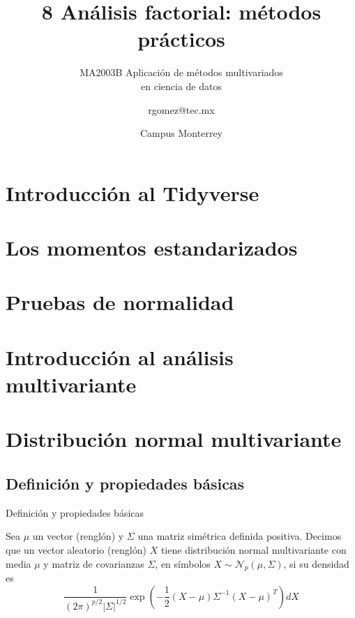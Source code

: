 \documentclass[
  11pt,
  ignorenonframetext,
  aspectratio=169]{beamer}
\title[MA2003B]{8 Análisis factorial: métodos prácticos}
\subtitle{MA2003B Aplicación de métodos multivariados \\ en ciencia de datos}
\institute[Tec de Monterrey]{EIC}
\date{Campus Monterrey}
\author{rgomez@tec.mx}
\date{}
\theoremstyle{plain}
\theoremstyle{definition}
\theoremstyle{remark}
\begin{document}
\begin{frame}[plain]{}
\label{section}
\addtocounter{framenumber}{-1}

\begin{center}
\Huge\textcolor{structure}{\inserttitle}

\vfill

\Large\insertsubtitle

\vfill

\vspace{1em}

\vfill


\large {} \qquad \insertlogo


\vfill

\end{center}
\end{frame}

\section{Introducción al Tidyverse}\label{introducciuxf3n-al-tidyverse}

\section{Los momentos estandarizados}\label{los-momentos-estandarizados}

\section{Pruebas de normalidad}\label{pruebas-de-normalidad}

\section{Introducción al análisis
multivariante}\label{introducciuxf3n-al-anuxe1lisis-multivariante}

\section{Distribución normal
multivariante}\label{distribuciuxf3n-normal-multivariante}

\subsection{Definición y propiedades
básicas}\label{definiciuxf3n-y-propiedades-buxe1sicas}

\begin{frame}{Definición y propiedades básicas}
\label{definiciuxf3n-y-propiedades-buxe1sicas-1}
\begin{definition}
Sea $\mu$ un vector (renglón) y $\Sigma$ una matriz simétrica definida positiva. Decimos que un vector aleatorio (renglón) $X$ tiene \alert{distribución normal multivariante} con media $\mu$ y matriz de covarianzas $\Sigma$, en símbolos $X \sim \mathcal{N}_{p}(\mu, \Sigma)$, si su densidad es
$$
\frac{1}{(2\pi)^{p/2} |\Sigma|^{1/2}} \exp\left(-\frac{1}{2}(X - \mu) \Sigma^{-1} (X - \mu)^{T}\right)dX
$$
\end{definition}
\end{frame}
\end{document}
